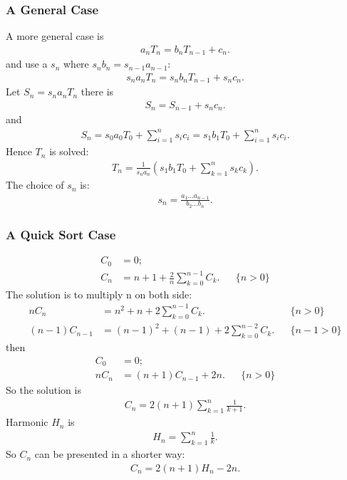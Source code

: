 \documentclass{article}
\begin{document}
\subsubsection{A General Case}
A more general case is
\begin{align}
a_nT_n = b_nT_{n-1}+c_n.
\end{align}
and use a $s_n$ where $s_nb_n = s_{n-1}a_{n-1}$:
\begin{align}
s_na_nT_n =s_nb_nT_{n-1}+s_nc_n.
\end{align}
Let $S_n = s_na_nT_n$ there is
\begin{align}
S_n = S_{n-1}+s_nc_n.
\end{align}
and
\begin{align}
S_n = s_0a_0T_0 + \sum_{i=1}^{n}{s_ic_i} = s_1b_1T_0 + \sum_{i=1}^{n}{s_ic_i}.
\end{align}
Hence $T_n$ is solved:
\begin{align}
T_n = \frac{1}{s_na_n}(s_1b_1T_0 + \sum_{k=1}^{n}{s_kc_k}).
\end{align}
The choice of $s_n$ is:
\begin{align}
s_n = \frac{a_1...a_{n-1}}{b_2...b_{n}}.
\end{align}

\subsubsection{A Quick Sort Case}
\begin{align}
C_0 &= 0;\\
C_n &= n+1+\frac{2}{n}\sum_{k=0}^{n-1}{C_k}. && \{n>0\}
\end{align}
The solution is to multiply n on both side:
\begin{align}
nC_n &= n^2+n+2\sum_{k=0}^{n-1}{C_k}. && \{n>0\}\\
(n-1)C_{n-1} &= (n-1)^2+(n-1)+2\sum_{k=0}^{n-2}{C_k}. && \{n-1>0\}
\end{align}
then
\begin{align}
C_0 &= 0;\\
nC_n &= (n+1)C_{n-1} + 2n. && \{n>0\}
\end{align}
So the solution is
\begin{align}
C_n = 2(n+1)\sum_{k=1}^{n}{\frac{1}{k+1}}.
\end{align}
Harmonic $H_n$ is
\begin{align}
H_n = \sum_{k=1}^{n}{\frac{1}{k}}.
\end{align}
So $C_n$ can be presented in a shorter way:
\begin{align}
C_n = 2(n+1)H_n - 2n.
\end{align}
\end{document}
